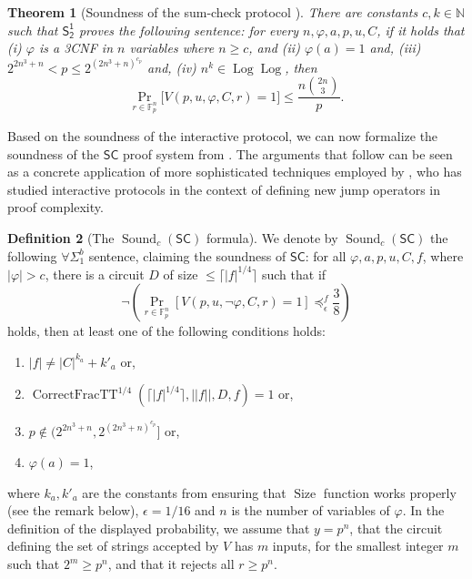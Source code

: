 \documentclass[11pt]{article}
\newcommand{\SOT}{\mathsf{S^1_2}}
\renewcommand{\SC}{\mathsf{SC}}
\newcommand{\sound}{\operatorname{Sound}}
\DeclareMathOperator*{\foo}{Pr}
\newcommand{\setsize}{\operatorname{Size}}
\def\tt{\operatorname{CorrectFracTT}}
\theoremstyle{definition}
\newtheorem{definition}{Definition}[section]
\theoremstyle{plain}
\newtheorem{theorem}[definition]{Theorem}
\theoremstyle{remark}
\newcommand{\bN}{\mathbb{N}}
\newcommand{\bF}{\mathbb{F}}
\newcommand{\Log}{\operatorname{Log}}
\begin{document}
\begin{theorem}[Soundness of the sum-check protocol {\cite[Thm. 15.3]{Kha23-PhD}}]\label{soundness}
    There are constants $c,k\in\bN$ such that $\SOT$ proves the following sentence: for every $n,\varphi,a,p,u,C$, if it holds that (i) $\varphi$ is a 3CNF in $n$ variables where $n\geq c$, and (ii) $\varphi(a)=1$ and, (iii) $2^{2n^3+n}<p \leq 2^{{(2n^3+n)}^{c_p}}$ and,
    (iv) $n^k\in\Log\Log$,
    then $$\foo_{r\in\bF_p^n}\big[V(p,u,\varphi,C,r)=1\big]\leq \frac{n\binom{2n}{3}}{p}.$$
\end{theorem}

Based on the soundness of the interactive protocol, we can now formalize the soundness of the $\SC$ proof system from . The arguments that follow can be seen as a concrete application of more sophisticated techniques employed by \citeauthor{Kha23} \cite{Kha23, Kha23-PhD}, who has studied interactive protocols in the context of defining new jump operators in proof complexity. 

\begin{definition}[The $\sound_c(\SC)$ formula]\label{soundnessdef}
    We denote by $\sound_c(\SC)$ the following $\forall\Sigma^b_1$ sentence, claiming the soundness of $\SC$: for all $\varphi,a,p,u,C,f$, where $|\varphi|>c$, there is a circuit $D$ of size $\leq \lceil|f|^{1/4}\rceil$ such that if
    $$\neg\left(\foo_{r\in\bF_p^n}[V(p,u,\neg\varphi,C,r)=1]\preceq^f_\epsilon \frac{3}{8}\right)$$
    holds, then at least one of the following conditions holds:
    \begin{enumerate}[label=(\roman*)]
    \item $|f|\neq|C|^{k_a}+k'_a$ or,
        \item $\tt^{1/4}(\lceil|f|^{1/4}\rceil,||f||,D,f)=1$ or,
        \item $p\not\in (2^{2n^3+n},2^{{(2n^3+n)}^{c_p}}]$ or,
        \item $\varphi(a)=1$,
    \end{enumerate}
    where $k_a, k'_a$ are the constants from  ensuring that $\setsize$ function works properly (see the remark below), $\epsilon={1/16}$ and $n$ is the number of variables of $\varphi$. In the definition of the displayed probability, we assume that $y=p^n$, that the circuit defining the set of strings accepted by $V$ has $m$ inputs, for the smallest integer $m$ such that $2^m\ge p^n$, and that it rejects all $r\ge p^n$. 
\end{definition}
\end{document}
